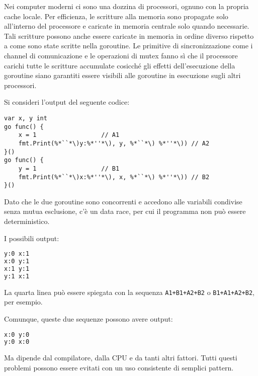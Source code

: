 Nei computer moderni ci sono una dozzina di processori, ognuno con la propria cache locale.
Per efficienza, le scritture alla memoria sono propagate solo all'interno del processore e caricate in memoria centrale solo quando necessarie.
Tali scritture possono anche essere caricate in memoria in ordine diverso rispetto a come sono state scritte nella goroutine.
Le primitive di sincronizzazione come i channel di comunicazione e le operazioni di mutex fanno sì che il processore carichi tutte le scritture accumulate cosicché gli effetti dell'esecuzione della goroutine siano garantiti essere visibili alle goroutine in esecuzione sugli altri processori.

Si consideri l'output del seguente codice:
\begin{lstlisting}[frame=single, label={lst:lstlisting9-4.1}]
var x, y int
go func() {
    x = 1                  // A1
    fmt.Print(%*``*\)y:%*''*\), y, %*``*\) %*''*\)) // A2
}()
go func() {
    y = 1                  // B1
    fmt.Print(%*``*\)x:%*''*\), x, %*``*\) %*''*\)) // B2
}()
\end{lstlisting}
Dato che le due goroutine sono concorrenti e accedono alle variabili condivise senza mutua esclusione, c'è un data race, per cui il programma non può essere deterministico.

I possibili output:
\begin{lstlisting}[language=bash, frame=L, label={lst:lstlisting9-4.2}]
y:0 x:1
x:0 y:1
x:1 y:1
y:1 x:1
\end{lstlisting}
La quarta linea può essere spiegata con la sequenza \verb|A1+B1+A2+B2| o \verb|B1+A1+A2+B2|, per esempio.

Comunque, queste due sequenze possono avere output:
\begin{lstlisting}[language=bash, frame=L, label={lst:lstlisting9-4.3}]
x:0 y:0
y:0 x:0
\end{lstlisting}
Ma dipende dal compilatore, dalla CPU e da tanti altri fattori.
Tutti questi problemi possono essere evitati con un uso consistente di semplici pattern.
